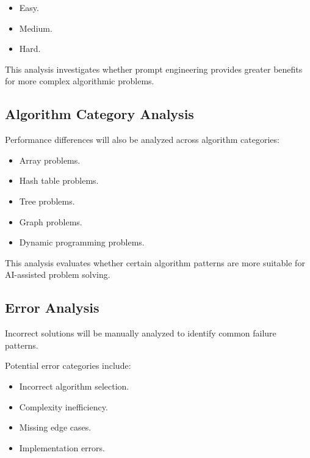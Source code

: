 \begin{itemize}

\item Easy.

\item Medium.

\item Hard.

\end{itemize}


This analysis investigates whether prompt engineering provides greater benefits
for more complex algorithmic problems.



\subsection{Algorithm Category Analysis}


Performance differences will also be analyzed across algorithm categories:


\begin{itemize}

\item Array problems.

\item Hash table problems.

\item Tree problems.

\item Graph problems.

\item Dynamic programming problems.

\end{itemize}


This analysis evaluates whether certain algorithm patterns are more suitable
for AI-assisted problem solving.



\subsection{Error Analysis}


Incorrect solutions will be manually analyzed to identify common failure
patterns.


Potential error categories include:


\begin{itemize}

\item Incorrect algorithm selection.

\item Complexity inefficiency.

\item Missing edge cases.

\item Implementation errors.

\end{itemize}



